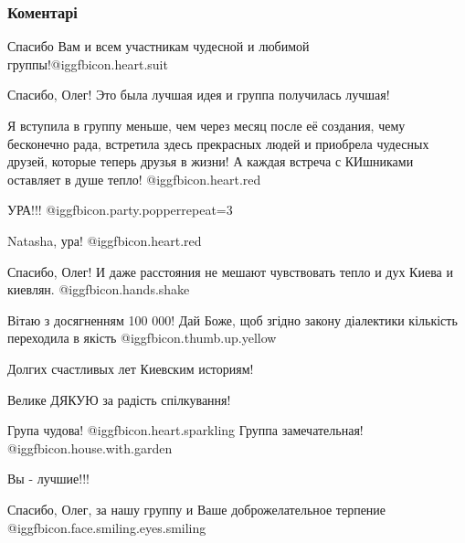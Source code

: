  
 
 
 
 
\subsubsection{Коментарі}

\begin{itemize} %
Спасибо Вам и всем участникам чудесной и любимой группы!@igg{fbicon.heart.suit}


Спасибо, Олег! Это была лучшая идея и группа получилась лучшая!

Я вступила в группу меньше, чем через месяц после её создания, чему бесконечно
рада, встретила здесь прекрасных людей и приобрела чудесных
друзей, которые теперь друзья в жизни! А каждая встреча с
КИшниками оставляет в душе тепло! @igg{fbicon.heart.red}

УРА!!!  @igg{fbicon.party.popper}{repeat=3} 

\begin{itemize} %
Natasha, ура! @igg{fbicon.heart.red}
\end{itemize} %

Спасибо, Олег! И даже расстояния не мешают чувствовать тепло и дух Киева и киевлян.  @igg{fbicon.hands.shake} 

Вітаю з досягненням 100 000! Дай Боже, щоб згідно закону діалектики кількість переходила в якість @igg{fbicon.thumb.up.yellow} 

Долгих счастливых лет Киевским историям!

Велике ДЯКУЮ за радість спілкування!

Група чудова! @igg{fbicon.heart.sparkling}  Группа замечательная! @igg{fbicon.house.with.garden} 

Вы - лучшие!!!

Спасибо, Олег, за нашу группу и Ваше доброжелательное терпение  @igg{fbicon.face.smiling.eyes.smiling} 


\end{itemize}

